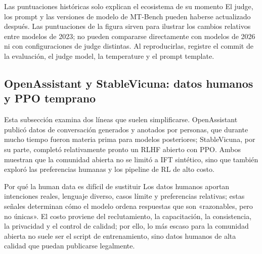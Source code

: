 \begin{warningbox}{Las puntuaciones históricas solo explican el ecosistema de su momento}
El judge, los prompt y las versiones de modelo de MT-Bench pueden haberse actualizado después. Las puntuaciones de la figura sirven para ilustrar los cambios relativos entre modelos de 2023; no pueden compararse directamente con modelos de 2026 ni con configuraciones de judge distintas. Al reproducirlas, registre el commit de la evaluación, el judge model, la temperature y el prompt template.
\end{warningbox}


\subsection{OpenAssistant y StableVicuna: datos humanos y PPO temprano}

Esta subsección examina dos líneas que suelen simplificarse. OpenAssistant publicó datos de conversación generados y anotados por personas, que durante mucho tiempo fueron materia prima para modelos posteriores; StableVicuna, por su parte, completó relativamente pronto un RLHF abierto con PPO. Ambos muestran que la comunidad abierta no se limitó a IFT sintético, sino que también exploró las preferencias humanas y los pipeline de RL de alto costo.



\begin{importantbox}{Por qué la human data es difícil de sustituir}
Los datos humanos aportan intenciones reales, lenguaje diverso, casos límite y preferencias relativas; estas señales determinan cómo el modelo ordena respuestas que son «razonables, pero no únicas». El costo proviene del reclutamiento, la capacitación, la consistencia, la privacidad y el control de calidad; por ello, lo más escaso para la comunidad abierta no suele ser el script de entrenamiento, sino datos humanos de alta calidad que puedan publicarse legalmente.
\end{importantbox}

